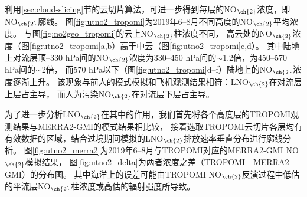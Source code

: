 利用\ref{sec:cloud-slicing}节的云切片算法，可进一步得到每层的NO$_{\ch{2}}$浓度，即NO$_{\ch{2}}$廓线。
图\ref{fig:utno2_tropomi}为2019年6--8月不同高度的NO$_{\ch{2}}$平均浓度。
与图\ref{fig:no2geo_tropomi}的云上NO$_{\ch{2}}$柱浓度不同，
高云处的NO$_{\ch{2}}$浓度（图\ref{fig:utno2_tropomi}a,b）高于中云（图\ref{fig:utno2_tropomi}c,d）。
其中陆地上对流层顶--330 hPa间的NO$_{\ch{2}}$浓度为330--450 hPa间的$\sim$1.2倍，为450--570 hPa间的$\sim$2倍，
而570 hPa以下（图\ref{fig:utno2_tropomi}d--f）陆地上的NO$_{\ch{2}}$浓度逐渐上升。
该现象与前人的模式模拟和飞机观测结果相符：LNO$_{\ch{2}}$在对流层上层占主导，
而人为污染NO$_{\ch{2}}$在对流层下层占主导\citep{Pickering.1996,Ott.2010,Laughner.2017}。

为了进一步分析LNO$_{\ch{2}}$在其中的作用，我们首先将各个高度层的TROPOMI观测结果与MERRA2-GMI的模式结果相比较，
接着选取TROPOMI云切片各层均有有效数据的区域，结合过境期间模拟的LNO$_{\ch{2}}$排放速率垂直分布进行廓线分析。
图\ref{fig:utno2_merra2}为2019年6--8月与TROPOMI对应的MERRA2-GMI NO$_{\ch{2}}$模拟结果，
图\ref{fig:utno2_delta}为两者浓度之差（TROPOMI - MERRA2-GMI）的分布图。
其中海洋上的误差可能由TROPOMI NO$_{\ch{2}}$反演过程中低估的平流层NO$_{\ch{2}}$柱浓度或高估的辐射强度所导致\citep{VanGeffen.2020}。

